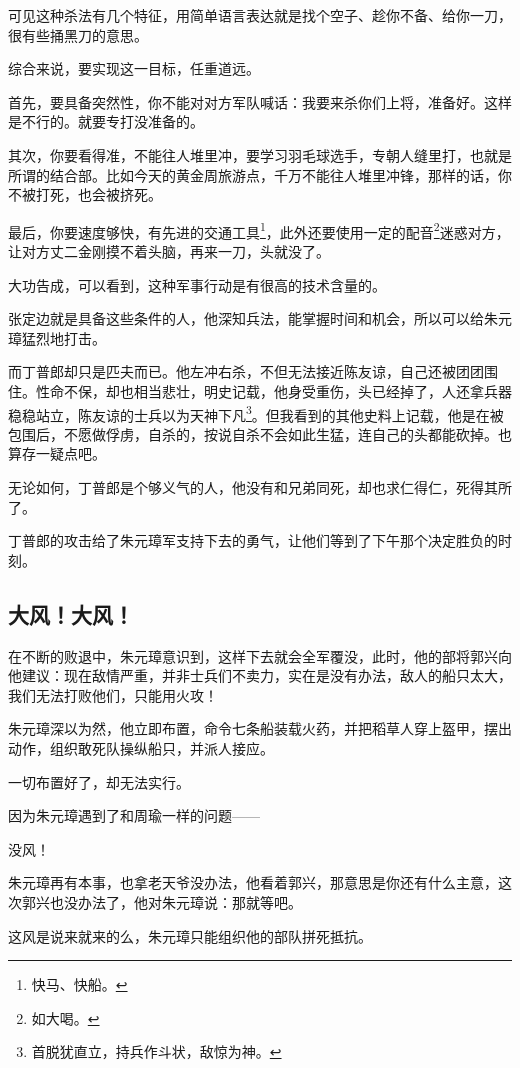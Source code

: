 \begin{multicols}{\theparacolNo}
		可见这种杀法有几个特征，用简单语言表达就是找个空子、趁你不备、给你一刀，很有些捅黑刀的意思。

		综合来说，要实现这一目标，任重道远。

		首先，要具备突然性，你不能对对方军队喊话：我要来杀你们上将，准备好。这样是不行的。就要专打没准备的。

		其次，你要看得准，不能往人堆里冲，要学习羽毛球选手，专朝人缝里打，也就是所谓的结合部。比如今天的黄金周旅游点，千万不能往人堆里冲锋，那样的话，你不被打死，也会被挤死。

		最后，你要速度够快，有先进的交通工具\footnote{快马、快船。}，此外还要使用一定的配音\footnote{如大喝。}迷惑对方，让对方丈二金刚摸不着头脑，再来一刀，头就没了。

		大功告成，可以看到，这种军事行动是有很高的技术含量的。

		张定边就是具备这些条件的人，他深知兵法，能掌握时间和机会，所以可以给朱元璋猛烈地打击。

		而丁普郎却只是匹夫而已。他左冲右杀，不但无法接近陈友谅，自己还被团团围住。性命不保，却也相当悲壮，明史记载，他身受重伤，头已经掉了，人还拿兵器稳稳站立，陈友谅的士兵以为天神下凡\footnote{首脱犹直立，持兵作斗状，敌惊为神。}。但我看到的其他史料上记载，他是在被包围后，不愿做俘虏，自杀的，按说自杀不会如此生猛，连自己的头都能砍掉。也算存一疑点吧。

		无论如何，丁普郎是个够义气的人，他没有和兄弟同死，却也求仁得仁，死得其所了。

		丁普郎的攻击给了朱元璋军支持下去的勇气，让他们等到了下午那个决定胜负的时刻。

		\subsection{大风！大风！}
		在不断的败退中，朱元璋意识到，这样下去就会全军覆没，此时，他的部将郭兴向他建议：现在敌情严重，并非士兵们不卖力，实在是没有办法，敌人的船只太大，我们无法打败他们，只能用火攻！

		朱元璋深以为然，他立即布置，命令七条船装载火药，并把稻草人穿上盔甲，摆出动作，组织敢死队操纵船只，并派人接应。

		一切布置好了，却无法实行。

		因为朱元璋遇到了和周瑜一样的问题——

		没风！

		朱元璋再有本事，也拿老天爷没办法，他看着郭兴，那意思是你还有什么主意，这次郭兴也没办法了，他对朱元璋说：那就等吧。

		这风是说来就来的么，朱元璋只能组织他的部队拼死抵抗。


\end{multicols}
